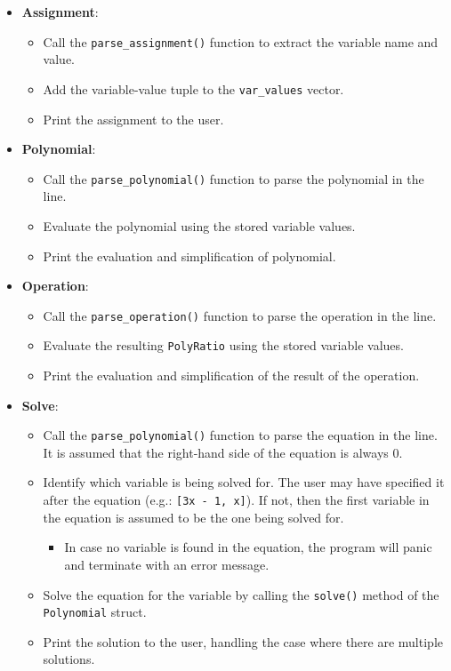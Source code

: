 \begin{itemize}
    \item \textbf{Assignment}:
    \begin{itemize}
        \item Call the \verb|parse_assignment()| function to extract the variable name and value.
        \item Add the variable-value tuple to the \verb|var_values| vector.
        \item Print the assignment to the user.
    \end{itemize}
    \item \textbf{Polynomial}:
    \begin{itemize}
        \item Call the \verb|parse_polynomial()| function to parse the polynomial in the line.
        \item Evaluate the polynomial using the stored variable values.
        \item Print the evaluation and simplification of polynomial.
    \end{itemize}
    \item \textbf{Operation}:
    \begin{itemize}
        \item Call the \verb|parse_operation()| function to parse the operation in the line.
        \item Evaluate the resulting \verb|PolyRatio| using the stored variable values.
        \item Print the evaluation and simplification of the result of the operation.
    \end{itemize}
    \item \textbf{Solve}:
    \begin{itemize}
        \item Call the \verb|parse_polynomial()| function to parse the equation in the line. It is assumed that the right-hand side of the equation is always $0$.
        \item Identify which variable is being solved for. The user may have specified it after the equation (e.g.: \texttt{[3x - 1, x]}). If not, then the first variable in the equation is assumed to be the one being solved for.
        \begin{itemize}
            \item In case no variable is found in the equation, the program will panic and terminate with an error message. 
        \end{itemize}
        \item Solve the equation for the variable by calling the \verb|solve()| method of the \verb|Polynomial| struct.
        \item Print the solution to the user, handling the case where there are multiple solutions.
    \end{itemize}
\end{itemize}

